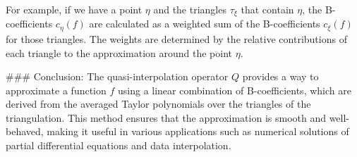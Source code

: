 For example, if we have a point \( \eta \) and the triangles \( \tau_\xi \) that contain \( \eta \), the B-coefficients \( c_\eta(f) \) are calculated as a weighted sum of the B-coefficients \( c_\xi(f) \) for those triangles. The weights are determined by the relative contributions of each triangle to the approximation around the point \( \eta \).

### Conclusion:
The quasi-interpolation operator \( Q \) provides a way to approximate a function \( f \) using a linear combination of B-coefficients, which are derived from the averaged Taylor polynomials over the triangles of the triangulation. This method ensures that the approximation is smooth and well-behaved, making it useful in various applications such as numerical solutions of partial differential equations and data interpolation.